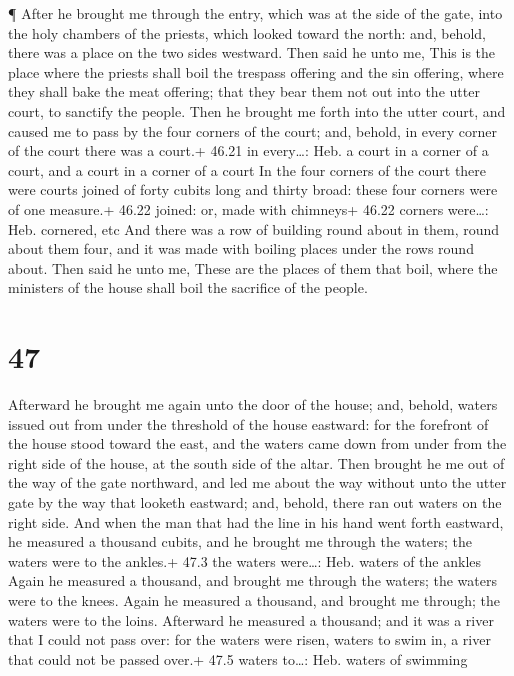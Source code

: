  ¶ After he brought me through the entry, which was at the
side of the gate, into the holy chambers of the priests, which looked
toward the north: and, behold, there was a place on the two sides
westward.  Then said he unto me, This is the place where
the priests shall boil the trespass offering and the sin offering, where
they shall bake the meat offering; that they bear them not out into the
utter court, to sanctify the people.  Then he brought me
forth into the utter court, and caused me to pass by the four corners of
the court; and, behold, in every corner of the court there was a court.+
46.21 in every\ldots: Heb. a court in a corner of a court, and a court
in a corner of a court  In the four corners of the court
there were courts joined of forty cubits long and thirty broad: these
four corners were of one measure.+ 46.22 joined: or, made with chimneys+
46.22 corners were\ldots: Heb. cornered, etc  And there was
a row of building round about in them, round about them four, and it was
made with boiling places under the rows round about.  Then
said he unto me, These are the places of them that boil, where the
ministers of the house shall boil the sacrifice of the people.

\hypertarget{section-46}{%
\section{47}\label{section-46}}

 Afterward he brought me again unto the door of the house;
and, behold, waters issued out from under the threshold of the house
eastward: for the forefront of the house stood toward the east, and the
waters came down from under from the right side of the house, at the
south side of the altar.  Then brought he me out of the way
of the gate northward, and led me about the way without unto the utter
gate by the way that looketh eastward; and, behold, there ran out waters
on the right side.  And when the man that had the line in
his hand went forth eastward, he measured a thousand cubits, and he
brought me through the waters; the waters were to the ankles.+ 47.3 the
waters were\ldots: Heb. waters of the ankles  Again he
measured a thousand, and brought me through the waters; the waters were
to the knees. Again he measured a thousand, and brought me through; the
waters were to the loins.  Afterward he measured a thousand;
and it was a river that I could not pass over: for the waters were
risen, waters to swim in, a river that could not be passed over.+ 47.5
waters to\ldots: Heb. waters of swimming


